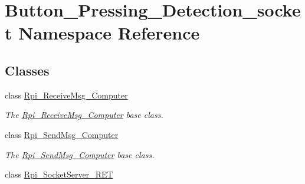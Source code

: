 \hypertarget{a00024}{}\section{Button\+\_\+\+Pressing\+\_\+\+Detection\+\_\+socket Namespace Reference}
\label{a00024}
\subsection*{Classes}
\begin{DoxyCompactItemize}
\item 
class \hyperlink{a00041}{Rpi\+\_\+\+Receive\+Msg\+\_\+\+Computer}
\begin{DoxyCompactList}\small\item\em The \hyperlink{a00041}{Rpi\+\_\+\+Receive\+Msg\+\_\+\+Computer} base class. \end{DoxyCompactList}\item 
class \hyperlink{a00045}{Rpi\+\_\+\+Send\+Msg\+\_\+\+Computer}
\begin{DoxyCompactList}\small\item\em The \hyperlink{a00045}{Rpi\+\_\+\+Send\+Msg\+\_\+\+Computer} base class. \end{DoxyCompactList}\item 
class \hyperlink{a00049}{Rpi\+\_\+\+Socket\+Server\+\_\+\+R\+ET}
\end{DoxyCompactItemize}
